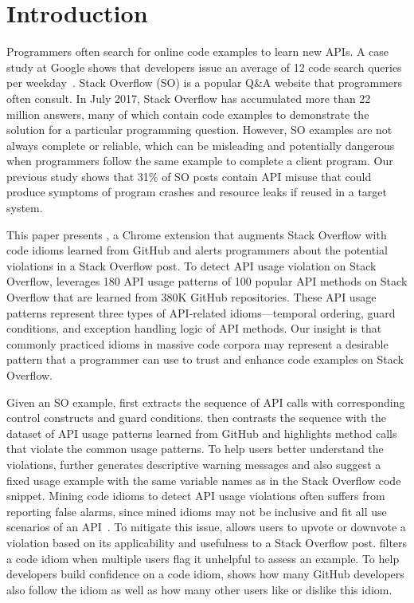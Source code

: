 \section{Introduction}
\label{sec:intro}
Programmers often search for online code examples to learn new APIs. A case study at Google shows that developers issue an average of 12 code search queries per weekday~\cite{sadowski2015developers}. Stack Overflow (SO) is a popular Q\&A website that programmers often consult. In July 2017, Stack Overflow has accumulated more than 22 million answers, many of which contain code examples to demonstrate the solution for a particular programming question. However, SO examples are not always complete or reliable, which can be misleading and potentially dangerous when programmers follow the same example to complete a client program. Our previous study shows that 31\% of SO posts contain API misuse that could produce symptoms of program crashes and resource leaks if reused in a target system. %

This paper presents {\tool}, a Chrome extension that augments Stack Overflow with code idioms learned from GitHub and alerts programmers about the potential violations in a Stack Overflow post. To detect API usage violation on Stack Overflow, {\tool} leverages 180 API usage patterns of 100 popular API methods on Stack Overflow that are learned from 380K GitHub repositories. These API usage patterns represent three types of API-related idioms---temporal ordering, guard conditions, and exception handling logic of API methods. Our insight is that commonly practiced idioms in massive code corpora may represent a desirable pattern that a programmer can use to trust and enhance code examples on Stack Overflow. 

Given an SO example, {\tool} first extracts the sequence of API calls with corresponding control constructs and guard conditions. {\tool} then contrasts the sequence with the dataset of API usage patterns learned from GitHub and highlights method calls that violate the common usage patterns. To help users better understand the violations, {\tool} further generates descriptive warning messages and also suggest a fixed usage example with the same variable names as in the Stack Overflow code snippet. Mining code idioms to detect API usage violations often suffers from reporting false alarms, since mined idioms may not be inclusive and fit all use scenarios of an API~\cite{liang2016antminer}. To mitigate this issue, {\tool} allows users to upvote or downvote a violation based on its applicability and usefulness to a Stack Overflow post. {\tool} filters a code idiom when multiple users flag it unhelpful to assess an example. To help developers build confidence on a code idiom, {\tool} shows how many GitHub developers also follow the idiom as well as how many other users like or dislike this idiom.

